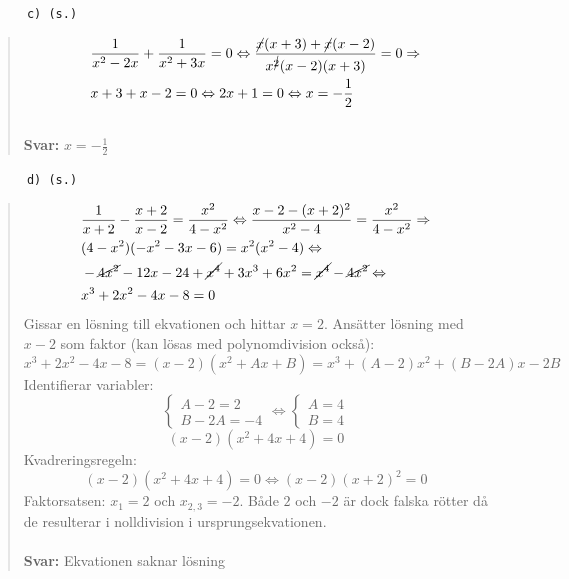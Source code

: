 \documentclass[a4paper]{article}
\newcommand{\tskcol}[1]{\textcolor{tskcol}{#1}}
\begin{document}
	\texttt{\tskcol{~~~~~~c) (s.)}}
	\begin{quotation}
		\noindent
		\begin{align*}
		&\dfrac{1}{x^2-2x}+\dfrac{1}{x^2+3x}=0 \Leftrightarrow 
		\dfrac{\cancel{x}(x+3)+\cancel{x}(x-2)}{x^{\cancel{2}}(x-2)(x+3)}=0 \Rightarrow \\
		&x+3+x-2=0 \Leftrightarrow
		2x+1=0 \Leftrightarrow
		x=-\frac{1}{2}
		\end{align*}
		\\
		\textbf{Svar:} $x=-\frac{1}{2}$
	\end{quotation}
	
	\pagebreak
	\texttt{\tskcol{~~~~~~d) (s.)}}
	\begin{quotation}
		\noindent
		\begin{align*}
		&\dfrac{1}{x+2}-\dfrac{x+2}{x-2}=\dfrac{x^2}{4-x^2}\Leftrightarrow
		\dfrac{x-2-(x+2)^2}{x^2-4}=\dfrac{x^2}{4-x^2} \Rightarrow \\
		&(4-x^2)(-x^2-3x-6)=x^2(x^2-4) \Leftrightarrow \\
		&-\cancel{4x^2}-12x-24+\cancel{x^4}+3x^3+6x^2=\cancel{x^4}-\cancel{4x^2} \Leftrightarrow \\
		&x^3+2x^2-4x-8=0
		\end{align*}
		Gissar en lösning till ekvationen och hittar $x=2$. Ansätter lösning med $x-2$ som faktor (kan lösas med polynomdivision också): 
		\[x^3+2x^2-4x-8=(x-2)(x^2+Ax+B)=x^3+(A-2)x^2+(B-2A)x-2B\]
		Identifierar variabler:
		\[\begin{cases}
		A-2=2 \\
		B-2A=-4
		\end{cases}
		\Leftrightarrow
		\begin{cases}
		A=4 \\
		B=4
		\end{cases}\]
		\[(x-2)(x^2+4x+4)=0\]
		Kvadreringsregeln:
		\[(x-2)(x^2+4x+4)=0\Leftrightarrow 
		(x-2)(x+2)^2=0\]
		Faktorsatsen: $x_1=2$ och $x_{2,3}=-2$.
		Både $2$ och $-2$ är dock falska rötter då de resulterar i nolldivision i ursprungsekvationen.
		\\ \\
		\textbf{Svar:} Ekvationen saknar lösning
	\end{quotation}
	
\end{document}
